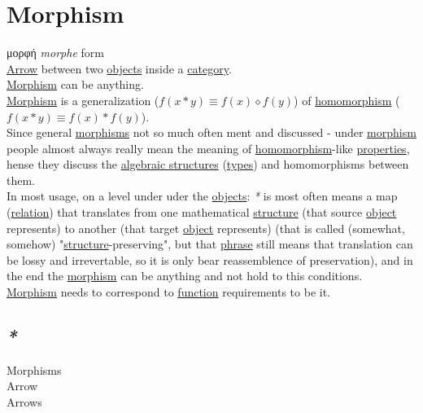 \documentclass[a4paper,14pt,oneside]{book}
\begin{document}
{\section{\label{orgc09f1a4}Morphism}
\label{sec:org2d94c94}
μορφή \emph{morphe} form\\
\hyperref[org4ef5cf1]{Arrow} between two \hyperref[org7c09bf4]{objects} inside a \hyperref[orgf2b19ad]{category}.\\

\hyperref[orgc09f1a4]{Morphism} can be anything.\\

\hyperref[orgc09f1a4]{Morphism} is a generalization (\(f(x*y) \equiv f(x) \diamond f(y)\)) of \hyperref[org203620e]{homomorphism} (\(f(x*y) \equiv f(x) * f(y)\)).\\
Since general \hyperref[org43d1069]{morphisms} not so much often ment and discussed - under \hyperref[orgc09f1a4]{morphism} people almost always really mean the meaning of \hyperref[org203620e]{homomorphism}-like \hyperref[org5fc06ca]{properties}, hense they discuss the \hyperref[org344f79b]{algebraic structures} (\hyperref[org51532d9]{types}) and homomorphisms between them.\\

In most usage, on a level under uder the \hyperref[org7c09bf4]{objects}: \emph{*} is most often means a map (\hyperref[orgc61e9ed]{relation}) that translates from one mathematical \hyperref[org080800e]{structure} (that source \hyperref[orgcc1bbec]{object} represents) to another (that target \hyperref[orgcc1bbec]{object} represents) (that is called (somewhat, somehow) "\hyperref[org080800e]{structure}-preserving", but that \hyperref[orgedc9aa5]{phrase} still means that translation can be lossy and irrevertable, so it is only bear reassemblence of preservation), and in the end the \hyperref[orgc09f1a4]{morphism} can be anything and not hold to this conditions.\\

\hyperref[orgc09f1a4]{Morphism} needs to correspond to \hyperref[org6a60524]{function} requirements to be it.\\

\subsection{\emph{*}}
\label{sec:org375a3f7}

\label{org43d1069}Morphisms\\
\label{org4ef5cf1}Arrow\\
\label{org3a8dbdc}Arrows\\

}
\end{document}

